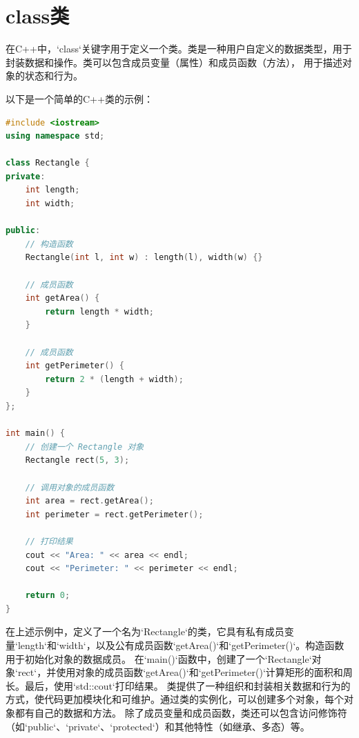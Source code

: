 \documentclass[12pt,twiside,a4paper]{ctexbook}
\numberwithin{chapter}{part}
\begin{document}
\chapter{class类}
在C++中，`class`关键字用于定义一个类。类是一种用户自定义的数据类型，用于封装数据和操作。类可以包含成员变量（属性）和成员函数（方法），
用于描述对象的状态和行为。

以下是一个简单的C++类的示例：

\begin{lstlisting}[language=C++]
#include <iostream>
using namespace std;

class Rectangle {
private:
    int length;
    int width;

public:
    // 构造函数
    Rectangle(int l, int w) : length(l), width(w) {}

    // 成员函数
    int getArea() {
        return length * width;
    }

    // 成员函数
    int getPerimeter() {
        return 2 * (length + width);
    }
};

int main() {
    // 创建一个 Rectangle 对象
    Rectangle rect(5, 3);

    // 调用对象的成员函数
    int area = rect.getArea();
    int perimeter = rect.getPerimeter();

    // 打印结果
    cout << "Area: " << area << endl;
    cout << "Perimeter: " << perimeter << endl;

    return 0;
}
\end{lstlisting}
在上述示例中，定义了一个名为`Rectangle`的类，它具有私有成员变量`length`和`width`，以及公有成员函数`getArea()`和`getPerimeter()`。构造函数用于初始化对象的数据成员。
在`main()`函数中，创建了一个`Rectangle`对象`rect`，并使用对象的成员函数`getArea()`和`getPerimeter()`计算矩形的面积和周长。最后，使用`std::cout`打印结果。
类提供了一种组织和封装相关数据和行为的方式，使代码更加模块化和可维护。通过类的实例化，可以创建多个对象，每个对象都有自己的数据和方法。
除了成员变量和成员函数，类还可以包含访问修饰符（如`public`、`private`、`protected`）和其他特性（如继承、多态）等。
\end{document}
